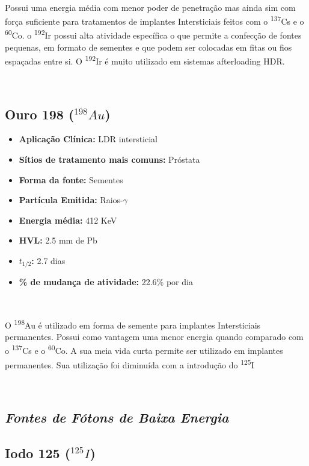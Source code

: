 \documentclass[11pt,a4paper]{article}
\begin{document}
			\

			Possui uma energia média com menor poder de penetração mas ainda sim com força suficiente para tratamentos de implantes Intersticiais feitos com o \textsuperscript{137}Cs e o \textsuperscript{60}Co. o \textsuperscript{192}Ir possui alta atividade específica o que permite a confecção de fontes pequenas, em formato de sementes e que podem ser colocadas em fitas ou fios espaçadas entre si. O \textsuperscript{192}Ir é muito utilizado em sistemas afterloading HDR.

			\

			\subsection{Ouro 198 \textbf{\textcolor{CarnationPink}{(${}^{198}Au$)}}}


			\begin{itemize}
				\item \textbf{Aplicação Clínica:} LDR intersticial
				\item \textbf{Sítios de tratamento mais comuns:} Próstata
				\item \textbf{Forma da fonte:} Sementes
				\item \textbf{Partícula Emitida:} Raios-$\gamma$
				\item \textbf{Energia média: } 412 KeV
				\item \textbf{HVL:} 2.5 mm de Pb
				\item \textbf{$t_{1/2}$:} 2.7 dias
				\item \textbf{\% de mudança de atividade: } 22.6\% por dia
			\end{itemize}

			\

			O \textsuperscript{198}Au é utilizado em forma de semente para implantes Intersticiais permanentes. Possui como vantagem uma menor energia quando comparado com o \textsuperscript{137}Cs e o \textsuperscript{60}Co. A sua meia vida curta permite ser utilizado em implantes permanentes. Sua utilização foi diminuída com a introdução do \textsuperscript{125}I

			\

		
		\subsection*{\textbf{\textit{\textcolor{CarnationPink}{Fontes de  Fótons de Baixa Energia}}}}


		\subsection{Iodo 125 \textbf{\textcolor{CarnationPink}{(${}^{125}I$)}}}
\end{document}
